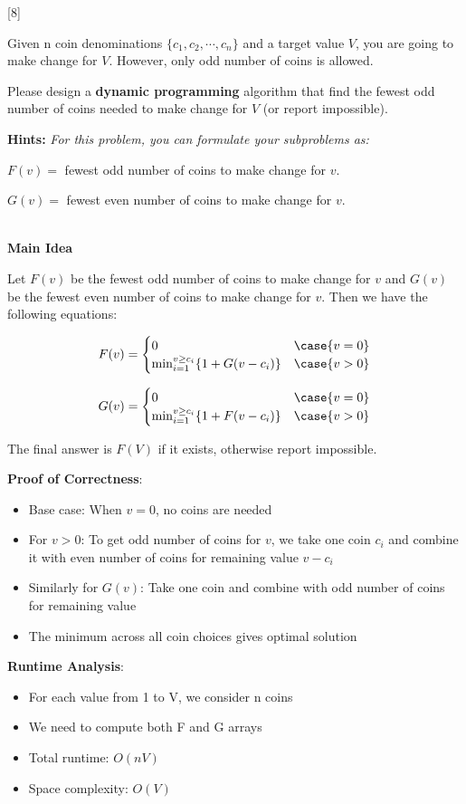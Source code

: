 [8]

Given n coin denominations $\{c_1,c_2,\cdots,c_n\}$ and a target value $V$, you are going to make change for $V$. However, only odd number of coins is allowed.

Please design a \textbf{dynamic programming} algorithm that find the fewest odd number of coins needed to make change for $V$ (or report impossible).

\textbf{Hints:} \textit{For this problem, you can formulate your subproblems as:}
\begin{center}
    $F(v)=$ fewest odd number of coins to make change for $v$.
    
    $G(v)=$ fewest even number of coins to make change for $v$.
\end{center}

\begin{solution}
    \\
    \textbf{Main Idea}
    
    Let $F(v)$ be the fewest odd number of coins to make change for $v$ and $G(v)$ be the fewest even number of coins to make change for $v$.
    Then we have the following equations:

    \[
    F(v)=
    \begin{cases}
        0 & \case{v=0} \\
        \min_{i=1}^{v \geq c_i} \{1+G(v-c_i)\} & \case{v>0}
    \end{cases}
    \]

    \[
    G(v)=
    \begin{cases}
        0 & \case{v=0} \\
        \min_{i=1}^{v \geq c_i} \{1+F(v-c_i)\} & \case{v>0}
    \end{cases}
    \]

    The final answer is $F(V)$ if it exists, otherwise report impossible.

    \textbf{Proof of Correctness}:
    \begin{itemize}
        \item Base case: When $v=0$, no coins are needed
        \item For $v>0$: To get odd number of coins for $v$, we take one coin $c_i$ and combine it with even number of coins for remaining value $v-c_i$
        \item Similarly for $G(v)$: Take one coin and combine with odd number of coins for remaining value
        \item The minimum across all coin choices gives optimal solution
    \end{itemize}

    \textbf{Runtime Analysis}:
    \begin{itemize}
        \item For each value from 1 to V, we consider n coins
        \item We need to compute both F and G arrays
        \item Total runtime: $O(nV)$
        \item Space complexity: $O(V)$
    \end{itemize}
\end{solution}

